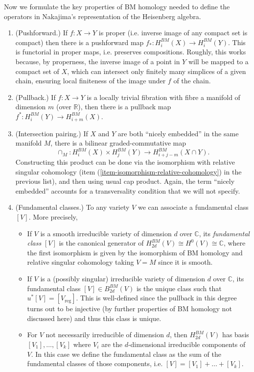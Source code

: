 \medskip\noindent
Now we formulate the key properties
of BM homology needed to define the operators
in Nakajima's representation of the Heisenberg algebra.

\begin{enumerate}
\item (Pushforward.)
\label{item-pushforward}
If $f:X \to Y$ is proper
(i.e. inverse image of any compact set is compact)
then there is a pushforward map $f_* :H_i^{BM}(X)\to H_i^{BM}(Y)$.
This is functorial in proper maps,
i.e. preserves compositions.
Roughly, this works because, by properness, the inverse image of
a point in $Y$ will be mapped to a compact set of $X$,
which can intersect only finitely many simplices of a given chain,
ensuring local finiteness of the image under $f$ of the chain.

\item 
\label{item-pullback}
(Pullback.) If $f:X \to Y$ 
is a locally trivial fibration with
fibre a manifold of dimension $m$ (over $\mathbb{R}$),
then there is a pullback map
$f^* :H_i^{BM}(Y)\to H_{i+m}^{BM}(X)$.

\item  
\label{item-intersection}
(Intersection pairing.) If $X$ and $Y$ 
are both ``nicely embedded'' in the same
manifold $M$, there is a bilinear graded-commutative map
$$
\cap_M:H_i^{BM}(X)\times H_j^{BM}(Y)
\to H_{i+j-m}^{BM}(X\cap Y).
$$
Constructing this product can be done
via the isomorphism with relative singular cohomology
(item (\ref{item-isomorphism-relative-cohomology})
in the previous list),
and then using usual cap product.
Again, the term ``nicely embedded'' accounts
for a transversality condition that we will not
specify.

\item (Fundamental classes.)
\label{item-fundamental-class}
To any variety $V$ we can associate a fundamental class $[V]$.
More precisely,
\begin{itemize}
\item If $V$ is a smooth irreducible variety
of dimension $d$ over $\mathbb{C}$,
its {\it fundamental class} $[V]$ is the canonical generator of 
$H_{2d}^{BM}(V)\cong H^0(V)\cong \mathbb{C}$,
where the first isomorphism
is given by the isomorphism of BM homology and
relative singular cohomology taking $V = M$ since it is smooth.

\item If $V$ is a (possibly singular) irreducible variety of dimension $d$
over $\mathbb{C}$, its fundamental class $[V] \in B_{2d}^{BM}(V)$
is the unique class such that
$u^* [V]=[V_{\text{reg}}]$.
This is well-defined since
the pullback in this degree turns
out to be injective (by further properties of BM homology not discussed here)
and thus this class is unique.

\item For $V$ not necessarily irreducible
of dimension $d$, then $H_{2d}^{BM}(V)$ 
has basis $[V_1],\ldots,[V_k]$
where $V_i$ are the $d$-dimensional 
irreducible components of $V$.
In this case we define the fundamental class
as the sum of the fundamental classes of those
components, i.e. $[V]=[V_1]+\ldots+[V_k]$.
\end{itemize}
\end{enumerate}

